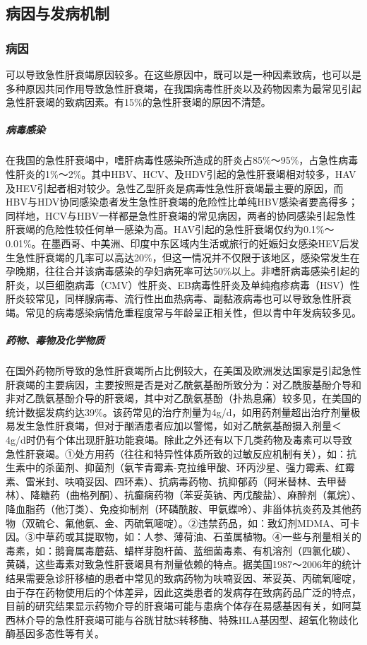 \subsection{病因与发病机制}

\subsubsection{病因}

可以导致急性肝衰竭原因较多。在这些原因中，既可以是一种因素致病，也可以是多种原因共同作用导致急性肝衰竭，在我国病毒性肝炎以及药物因素为最常见引起急性肝衰竭的致病因素。有15\%的急性肝衰竭的原因不清楚。

\subparagraph{病毒感染}

在我国的急性肝衰竭中，嗜肝病毒性感染所造成的肝炎占85\%～95\%，占急性病毒性肝炎的1\%～2\%。其中HBV、HCV、及HDV引起的急性肝衰竭相对较多，HAV及HEV引起者相对较少。急性乙型肝炎是病毒性急性肝衰竭最主要的原因，而HBV与HDV协同感染患者发生急性肝衰竭的危险性比单纯HBV感染者要高得多；同样地，HCV与HBV一样都是急性肝衰竭的常见病因，两者的协同感染引起急性肝衰竭的危险性较任何单一感染为高。HAV引起的急性肝衰竭仅约为0.1\%～0.01\%。在墨西哥、中美洲、印度中东区域内生活或旅行的妊娠妇女感染HEV后发生急性肝衰竭的几率可以高达20\%，但这一情况并不仅限于该地区，感染常发生在孕晚期，往往合并该病毒感染的孕妇病死率可达50\%以上。非嗜肝病毒感染引起的肝炎，以巨细胞病毒（CMV）性肝炎、EB病毒性肝炎及单纯疱疹病毒（HSV）性肝炎较常见，同样腺病毒、流行性出血热病毒、副黏液病毒也可以导致急性肝衰竭。常见的病毒感染病情危重程度常与年龄呈正相关性，但以青中年发病较多见。

\subparagraph{药物、毒物及化学物质}

在国外药物所导致的急性肝衰竭所占比例较大，在美国及欧洲发达国家是引起急性肝衰竭的主要病因，主要按照是否是对乙酰氨基酚所致分为：对乙酰胺基酚介导和非对乙酰氨基酚介导的肝衰竭，其中对乙酰氨基酚（扑热息痛）较多见，在美国的统计数据发病约达39\%。该药常见的治疗剂量为4g/d，如用药剂量超出治疗剂量极易发生急性肝衰竭，但对于酗酒患者应加以警惕，如对乙酰氨基酚摄入剂量＜
4g/d时仍有个体出现肝脏功能衰竭。除此之外还有以下几类药物及毒素可以导致急性肝衰竭。①处方用药（往往和特异性体质所致的过敏反应机制有关），如：抗生素中的杀菌剂、抑菌剂（氨苄青霉素-克拉维甲酸、环丙沙星、强力霉素、红霉素、雷米封、呋喃妥因、四环素）、抗病毒药物、抗抑郁药（阿米替林、去甲替林）、降糖药（曲格列酮）、抗癫痫药物（苯妥英钠、丙戊酸盐）、麻醉剂（氟烷）、降血脂药（他汀类）、免疫抑制剂（环磷酰胺、甲氨蝶呤）、非甾体抗炎药及其他药物（双硫仑、氟他氨、金、丙硫氧嘧啶）。②违禁药品，如：致幻剂MDMA、可卡因。③中草药或其提取物，如：人参、薄荷油、石茧属植物。④一些与剂量相关的毒素，如：鹅膏属毒蘑菇、蜡样芽胞杆菌、蓝细菌毒素、有机溶剂（四氯化碳）、黄磷，这些毒素对致急性肝衰竭具有剂量依赖的特点。据美国1987～2006年的统计结果需要急诊肝移植的患者中常见的致病药物为呋喃妥因、苯妥英、丙硫氧嘧啶，由于存在药物使用后的个体差异，因此这类患者的发病存在致病药品广泛的特点，目前的研究结果显示药物介导的肝衰竭可能与患病个体存在易感基因有关，如阿莫西林介导的急性肝衰竭可能与谷胱甘肽S转移酶、特殊HLA基因型、超氧化物歧化酶基因多态性等有关。

